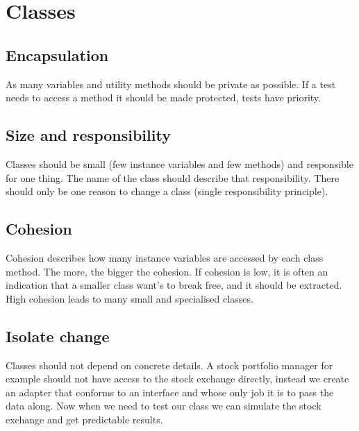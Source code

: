 \section{Classes}

\subsection{Encapsulation}
As many variables and utility methods should be private as possible. If a test needs to access a method it should be made protected, tests have priority.

\subsection{Size and responsibility}
Classes should be small (few instance variables and few methods) and responsible for one thing. The name of the class should describe that responsibility. There should only be one reason to change a class (single responsibility principle).

\subsection{Cohesion}
Cohesion describes how many instance variables are accessed by each class method. The more, the bigger the cohesion. If cohesion is low, it is often an indication that a smaller class want's to break free, and it should be extracted. High cohesion leads to many small and specialised classes.

\subsection{Isolate change}
Classes should not depend on concrete details. A stock portfolio manager for example should not have access to the stock exchange directly, instead we create an adapter that conforms to an interface and whose only job it is to pass the data along. Now when we need to test our class we can simulate the stock exchange and get predictable results.
